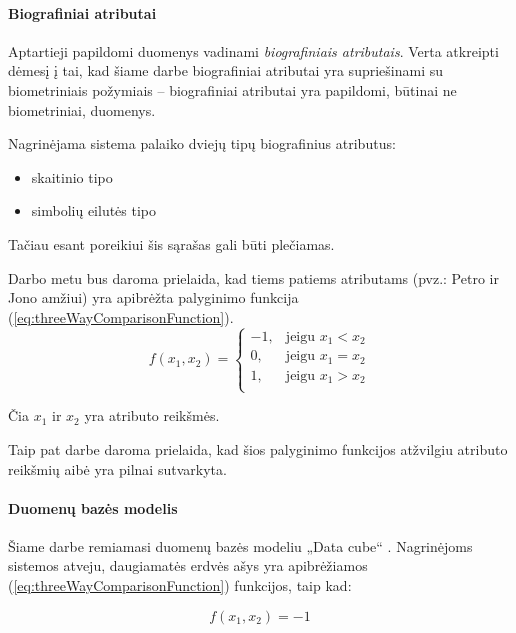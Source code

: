 \paragraph{Biografiniai atributai}

Aptartieji papildomi duomenys vadinami {\it biografiniais atributais}.
Verta atkreipti dėmesį į tai, kad šiame darbe biografiniai atributai yra supriešinami su biometriniais požymiais -- biografiniai atributai yra papildomi, būtinai ne biometriniai, duomenys.

Nagrinėjama sistema palaiko dviejų tipų biografinius atributus:
\begin{itemize}
\item skaitinio tipo
\item simbolių eilutės tipo
\end{itemize}
Tačiau esant poreikiui šis sąrašas gali būti plečiamas.

Darbo metu bus daroma prielaida, kad tiems patiems atributams (pvz.: Petro ir Jono amžiui) yra apibrėžta palyginimo funkcija (\ref{eq:threeWayComparisonFunction}).
\begin{equation}
	f(x_1, x_2)=
\begin{cases}
	-1,& \text{jeigu } x_1 < x_2\\
	0,& \text{jeigu } x_1 = x_2\\
	1,& \text{jeigu } x_1 > x_2\\
\end{cases}
\label{eq:threeWayComparisonFunction}
\end{equation}

Čia $x_1$ ir $x_2$ yra atributo reikšmės.

Taip pat darbe daroma prielaida, kad šios palyginimo funkcijos atžvilgiu atributo reikšmių aibė yra pilnai sutvarkyta. %






\paragraph{Duomenų bazės modelis}

Šiame darbe remiamasi duomenų bazės modeliu „Data cube“ \cite{marcel2000modeling}.
Nagrinėjoms sistemos \cite{NeurotechnologyMegamatcherAccelerator} atveju, daugiamatės erdvės ašys yra apibrėžiamos (\ref{eq:threeWayComparisonFunction}) funkcijos, taip kad:

\begin{equation}
	f(x_1, x_2)=-1
\label{eq:increasingOrderOfAtributes}
\end{equation}

